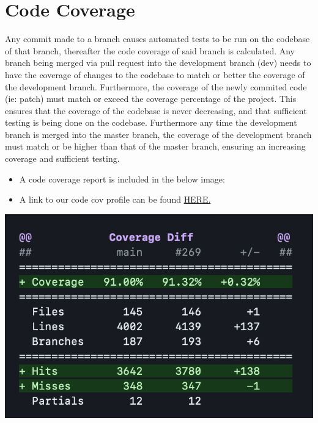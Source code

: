 \documentclass[12pt]{article}
\begin{document}
\section{Code Coverage}
Any commit made to a branch causes automated tests to be run on the codebase of that branch, thereafter the code coverage of said branch is calculated.
Any branch being merged via pull request into the development branch (dev) needs to have the coverage of changes to the codebase to match or better the coverage of the development branch.
Furthermore, the coverage of the newly commited code (ie: patch) must match or exceed the coverage percentage of the project.
This ensures that the coverage of the codebase is never decreasing, and that sufficient testing is being done on the codebase.
Furthermore any time the development branch is merged into the master branch, the coverage of the development branch must match or be higher than that of the master branch, ensuring an increasing coverage and sufficient testing.
\begin{itemize}
    \item A code coverage report is included in the below image:
    \item A link to our code cov profile can be found \href{https://codecov.io/gh/COS301-SE-2023/Domain-Pulse-A-Sentiment-Analysis-Platform}{HERE.}
\end{itemize}
\includegraphics[width=\textwidth]{codecovReport.png}

\newpage
\end{document}
